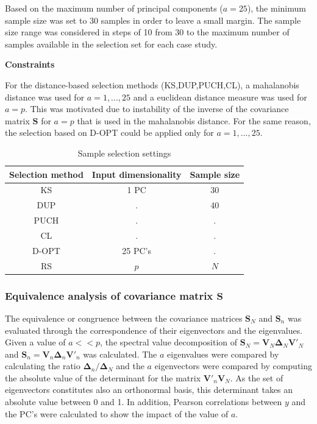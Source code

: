 \documentclass[journal=ancham,manuscript=article]{achemso}
\begin{document}
Based on the maximum number of principal components ($a=25$), the minimum sample size was set to 30 samples in order to leave a small margin. The sample size range was considered in steps of 10 from 30 to the maximum number of samples available in the selection set for each case study. 

\textbf{Constraints}

For the distance-based selection methods (KS,DUP,PUCH,CL), a mahalanobis distance was used for $a=1,...,25$ and a euclidean distance measure was used for $a=p$. This was motivated due to instability of the inverse of the covariance matrix $\mathbf{S}$ for $a=p$ that is used in the mahalanobis distance. For the same reason, the selection based on D-OPT could be applied only for $a=1,...,25$. 

\begin{table}[t]
\centering
\begin{tabular}{|c|c|c|} 
\hline
Selection method	& Input dimensionality	& Sample size	\\
\hline

KS & 1 PC   & 30  \\
DUP &  . & 40\\
PUCH &  . & . \\
CL & . & . \\
D-OPT & 25 PC's & .\\
RS & $p$ & $N$\\
\hline


\end{tabular}
\caption{Sample selection settings}
\label{tab_samplesel_settings_exhaustive_search}
\end{table}

\subsubsection{Equivalence analysis of covariance matrix $\mathbf{S}$}

The equivalence or congruence between the covariance matrices $\mathbf{S}_N$ and $\mathbf{S}_n$ was evaluated through the correspondence of their eigenvectors and the eigenvalues. Given a value of $a<<p$, the spectral value decomposition of $\mathbf{S}_N = \mathbf{V}_N \mathbf{\Delta}_N \mathbf{V}'_N$ and $\mathbf{S}_n = \mathbf{V}_n \mathbf{\Delta}_n \mathbf{V}'_n$ was calculated. The $a$ eigenvalues were compared by calculating the ratio  $\mathbf{\Delta}_n/\mathbf{\Delta}_N$ and the $a$ eigenvectors were compared by computing the absolute value of the determinant for the matrix $\mathbf{V}'_n\mathbf{V}_N$. As the set of eigenvectors constitutes also an orthonormal basis, this determinant takes an absolute value between 0 and 1. In addition, Pearson correlations between $y$ and the PC's were calculated to show the impact of the value of $a$.
\end{document}
